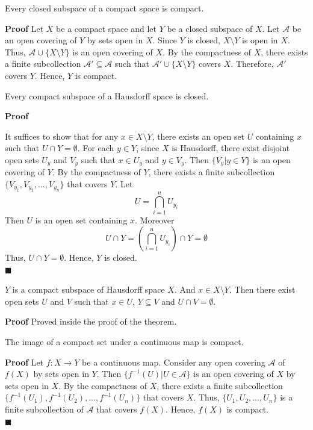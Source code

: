 \documentclass[main.tex]{subfiles}
\begin{document}
\begin{theorem}
    Every closed subspace of a compact space is compact. 
\end{theorem}
\par \noindent \textbf{Proof} Let $X$ be a compact space and let $Y$ be a closed subspace of $X$. Let $\mathcal{A}$ be an open covering of $Y$ by sets open in $X$. Since $Y$ is closed, $X\setminus Y$ is open in $X$. Thus, $\mathcal{A} \cup \{X\setminus Y\}$ is an open covering of $X$. By the compactness of $X$, there exists a finite subcollection $\mathcal{A}' \subseteq \mathcal{A}$ such that $\mathcal{A}' \cup \{X\setminus Y\}$ covers $X$. Therefore, $\mathcal{A}'$ covers $Y$. Hence, $Y$ is compact.
\begin{theorem}
    Every compact subspace of a Hausdorff space is closed. 
\end{theorem}
\par \noindent \textbf{Proof} 
\par It suffices to show that for any $x \in X \setminus Y$, there exists an open set $U$ containing $x$ such that $U \cap Y = \emptyset$. For each $y \in Y$, since $X$ is Hausdorff, there exist disjoint open sets $U_y$ and $V_y$ such that $x \in U_y$ and $y \in V_y$. Then $\{V_y | y \in Y\}$ is an open covering of $Y$. By the compactness of $Y$, there exists a finite subcollection $\{V_{y_1}, V_{y_2}, \ldots, V_{y_n}\}$ that covers $Y$. Let
\begin{equation}
    U = \bigcap_{i=1}^{n} U_{y_i}
\end{equation}
Then $U$ is an open set containing $x$. Moreover
\begin{equation}
    U \cap Y  = (\bigcap_{i=1}^{n} U_{y_i}) \cap Y = \emptyset 
\end{equation}
Thus, $U \cap Y = \emptyset$. Hence, $Y$ is closed. 
\mbox{} \\ \null \hfill $\blacksquare$ 
\begin{lemma}
    $Y$ is a compact subspace of Hausdorff space $X$. And $x \in X \setminus Y$. Then there exist open sets $U$ and $V$ such that $x \in U$, $Y \subseteq V$ and $U \cap V = \emptyset$.
\end{lemma}
\par \noindent \textbf{Proof} Proved inside the proof of the theorem. 

\begin{theorem}
    The image of a compact set under a continuous map is compact. 
\end{theorem}
\par \noindent \textbf{Proof} Let $f: X \rightarrow Y$ be a continuous map. Consider any open covering $\mathcal{A}$ of $f(X)$ by sets open in $Y$. Then $\{f^{-1}(U) | U \in \mathcal{A}\}$ is an open covering of $X$ by sets open in $X$. By the compactness of $X$, there exists a finite subcollection $\{f^{-1}(U_1), f^{-1}(U_2), \ldots, f^{-1}(U_n)\}$ that covers $X$. Thus, $\{U_1, U_2, \ldots, U_n\}$ is a finite subcollection of $\mathcal{A}$ that covers $f(X)$. Hence, $f(X)$ is compact.
\mbox{} \\ \null \hfill $\blacksquare$ 
\end{document}
